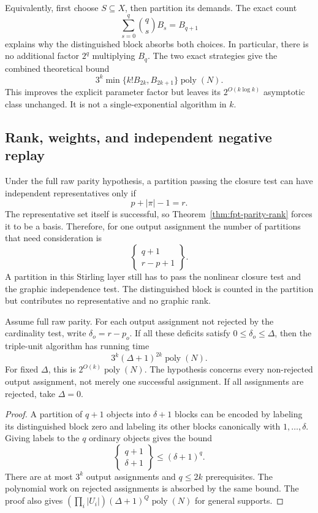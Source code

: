 Equivalently, first choose $S\subseteq X$, then partition its demands.
The exact count
\[
                    \sum_{s=0}^{q}\binom qs B_s=B_{q+1}
\]
explains why the distinguished block absorbs both choices. In particular,
there is no additional factor $2^q$ multiplying $B_q$. The two exact
strategies give the combined theoretical bound
\[
  3^k\min\{k!B_{2k},B_{2k+1}\}\operatorname{poly}(N).
\]
This improves the explicit parameter factor but leaves its
$2^{O(k\log k)}$ asymptotic class unchanged. It is not a single-exponential
algorithm in $k$.

\subsection{Rank, weights, and independent negative replay}

Under the full raw parity hypothesis, a partition passing the closure
test can have independent representatives only if
\[
                          p+|\pi|-1=r.
\]
The representative set itself is successful, so
Theorem~\ref{thm:fpt-parity-rank} forces it to be a basis. Therefore, for
one output assignment the number of partitions that need consideration is
\[
                 \left\{\begin{matrix}q+1\\r-p+1\end{matrix}\right\}.
\]
A partition in this Stirling layer still has to pass the nonlinear closure
test and the graphic independence test. The distinguished block is counted
in the partition but contributes no representative and no graphic rank.

\begin{corollary}
\label{cor:bounded-deficit}
Assume full raw parity. For each output assignment not rejected by the
cardinality test, write $\delta_o=r-p_o$. If all these deficits satisfy
$0\le\delta_o\le\Delta$, then the triple-unit algorithm has running time
\[
                       3^k(\Delta+1)^{2k}\operatorname{poly}(N).
\]
For fixed $\Delta$, this is $2^{O(k)}\operatorname{poly}(N)$.
The hypothesis concerns every non-rejected output assignment, not merely
one successful assignment. If all assignments are rejected, take $\Delta=0$.
\end{corollary}
\begin{proof}
A partition of $q+1$ objects into $\delta+1$ blocks can be encoded by
labeling its distinguished block zero and labeling its other blocks
canonically with $1,\ldots,\delta$. Giving labels to the $q$ ordinary
objects gives the bound
\[
              \left\{\begin{matrix}q+1\\\delta+1\end{matrix}\right\}
                              \le(\delta+1)^q.
\]
There are at most $3^k$ output assignments and $q\le2k$ prerequisites.
The polynomial work on rejected assignments is absorbed by the same
bound. The proof also gives
$(\prod_i|U_i|)(\Delta+1)^Q\operatorname{poly}(N)$ for general supports.
\end{proof}

